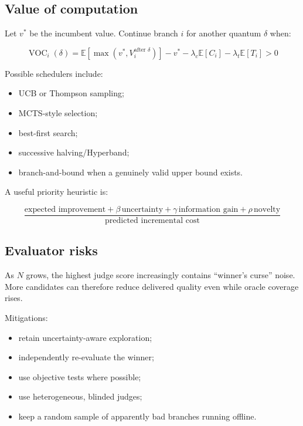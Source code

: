 \documentclass[
  letterpaper,
]{article}
\providecommand{\tightlist}{%
  \setlength{\itemsep}{0pt}\setlength{\parskip}{0pt}}
\begin{document}
\subsection{Value of computation}\label{value-of-computation}

Let \(v^*\) be the incumbent value. Continue branch \(i\) for another quantum \(\delta\) when:

\[
\operatorname{VOC}_i(\delta)=
\mathbb E[\max(v^*,V_i^{\text{after }\delta})]-v^*
-\lambda_c\mathbb E[C_i]
-\lambda_t\mathbb E[T_i]
>0
\]

Possible schedulers include:

\begin{itemize}
\tightlist
\item
  UCB or Thompson sampling;
\item
  MCTS-style selection;
\item
  best-first search;
\item
  successive halving/Hyperband;
\item
  branch-and-bound when a genuinely valid upper bound exists.
\end{itemize}

A useful priority heuristic is:

\[
\frac{
\text{expected improvement}
+\beta\,\text{uncertainty}
+\gamma\,\text{information gain}
+\rho\,\text{novelty}
}{
\text{predicted incremental cost}
}
\]

\subsection{Evaluator risks}\label{evaluator-risks}

As \(N\) grows, the highest judge score increasingly contains ``winner's curse'' noise. More candidates can therefore reduce delivered quality even while oracle coverage rises.

Mitigations:

\begin{itemize}
\tightlist
\item
  retain uncertainty-aware exploration;
\item
  independently re-evaluate the winner;
\item
  use objective tests where possible;
\item
  use heterogeneous, blinded judges;
\item
  keep a random sample of apparently bad branches running offline.
\end{itemize}
\end{document}
